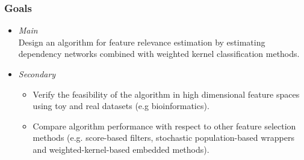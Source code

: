 \begin{frame}
\frametitle{Goals}
\pause
\begin{itemize}
	\item \emph{Main} \\ Design an algorithm for feature relevance estimation by estimating dependency networks combined with weighted kernel classification methods.
	\pause
	\item \emph{Secondary}
	\begin{itemize}
		\pause
		\item Verify the feasibility of the algorithm in high dimensional feature spaces using toy and real datasets (e.g bioinformatics).
		\pause
		\item Compare algorithm performance with respect to other feature selection methods (e.g. score-based filters, stochastic population-based wrappers and weighted-kernel-based embedded methods).
	\end{itemize}
\end{itemize}
\end{frame}